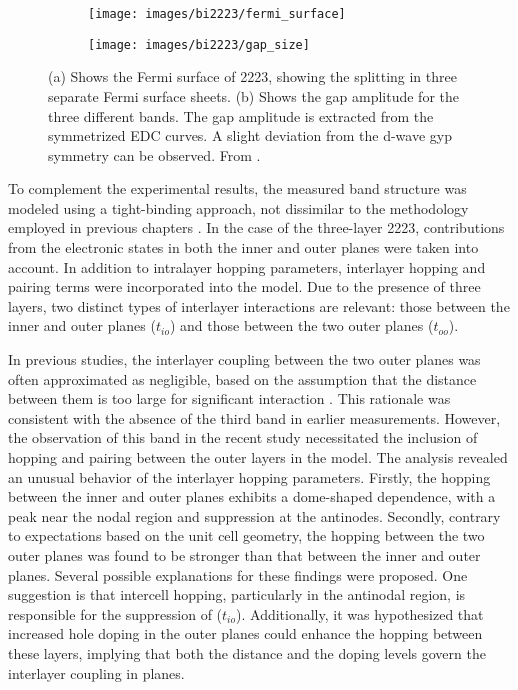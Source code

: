 \begin{figure}
	\centering
	\begin{subfigure}[b]{0.59\textwidth}
		\texttt{[image: images/bi2223/fermi\_surface]}
		\caption{}
	\end{subfigure}
	\hfill
	\begin{subfigure}[b]{0.4\textwidth}
		\texttt{[image: images/bi2223/gap\_size]}
		\caption{}
	\end{subfigure}
	\caption{(a) Shows the Fermi surface of 2223, showing the splitting in three separate Fermi surface sheets. (b) Shows the gap amplitude for the three different bands. The gap amplitude is extracted from the symmetrized EDC curves. A slight deviation from the d-wave gyp symmetry can be observed. From \cite{luo_electronic_2023}.}
	\label{fig:arpes_sketch}
\end{figure}

To complement the experimental results, the measured band structure was modeled using a tight-binding approach, not dissimilar to the methodology employed in previous chapters \cite{luo_subtle_2021}.
In the case of the three-layer 2223, contributions from the electronic states in both the inner and outer  planes were taken into account.
In addition to intralayer hopping parameters, interlayer hopping and pairing terms were incorporated into the model.
Due to the presence of three layers, two distinct types of interlayer interactions are relevant: those between the inner and outer planes ($t_{io}$) and those between the two outer planes ($t_{oo}$).

In previous studies, the interlayer coupling between the two outer planes was often approximated as negligible, based on the assumption that the distance between them is too large for significant interaction \cite{kunisada_observation_2017,ideta_hybridization_2021}.
This rationale was consistent with the absence of the third band in earlier measurements.
However, the observation of this band in the recent study \cite{luo_electronic_2023} necessitated the inclusion of hopping and pairing between the outer layers in the model.
The analysis revealed an unusual behavior of the interlayer hopping parameters.
Firstly, the hopping between the inner and outer planes exhibits a dome-shaped dependence, with a peak near the nodal region and suppression at the antinodes.
Secondly, contrary to expectations based on the unit cell geometry, the hopping between the two outer planes was found to be stronger than that between the inner and outer planes.
Several possible explanations for these findings were proposed.
One suggestion is that intercell hopping, particularly in the antinodal region, is responsible for the suppression of ($t_{io}$).
Additionally, it was hypothesized that increased hole doping in the outer planes could enhance the hopping between these layers, implying that both the distance and the doping levels govern the interlayer coupling in  planes.

